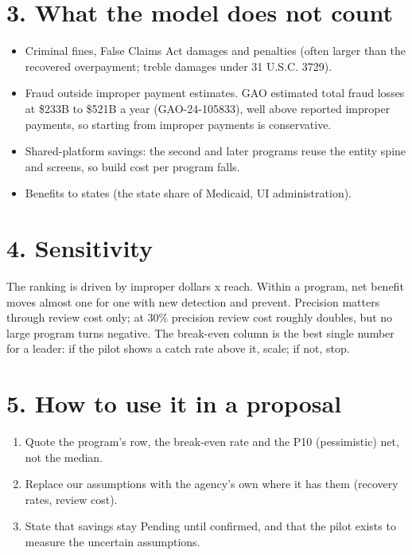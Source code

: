 \documentclass[letterpaper,11pt]{article}
\providecommand{\tightlist}{\setlength{\itemsep}{0pt}\setlength{\parskip}{0pt}}
\begin{document}
\hypertarget{what-the-model-does-not-count}{%
\section*{3. What the model does not
count}\label{what-the-model-does-not-count}}

\begin{itemize}
\tightlist
\item
  Criminal fines, False Claims Act damages and penalties (often larger
  than the recovered overpayment; treble damages under 31 U.S.C. 3729).
\item
  Fraud outside improper payment estimates. GAO estimated total fraud
  losses at \$233B to \$521B a year (GAO-24-105833), well above reported
  improper payments, so starting from improper payments is conservative.
\item
  Shared-platform savings: the second and later programs reuse the
  entity spine and screens, so build cost per program falls.
\item
  Benefits to states (the state share of Medicaid, UI administration).
\end{itemize}

\hypertarget{sensitivity}{%
\section*{4. Sensitivity}\label{sensitivity}}

The ranking is driven by improper dollars x reach. Within a program, net
benefit moves almost one for one with new detection and prevent.
Precision matters through review cost only; at 30\% precision review
cost roughly doubles, but no large program turns negative. The
break-even column is the best single number for a leader: if the pilot
shows a catch rate above it, scale; if not, stop.

\hypertarget{how-to-use-it-in-a-proposal}{%
\section*{5. How to use it in a
proposal}\label{how-to-use-it-in-a-proposal}}

\begin{enumerate}
\def\labelenumi{\arabic{enumi}.}
\tightlist
\item
  Quote the program's row, the break-even rate and the P10 (pessimistic)
  net, not the median.
\item
  Replace our assumptions with the agency's own where it has them
  (recovery rates, review cost).
\item
  State that savings stay Pending until confirmed, and that the pilot
  exists to measure the uncertain assumptions.
\end{enumerate}
\end{document}
